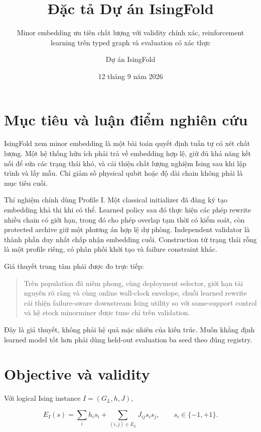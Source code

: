 \documentclass[
  vietnamese,
  10pt,
  a4paper,
]{article}
\title{Đặc tả Dự án IsingFold}
\subtitle{Minor embedding ưu tiên chất lượng với validity chính xác,
reinforcement learning trên typed graph và evaluation có xác thực}
\author{Dự án IsingFold}
\date{12 tháng 9 năm 2026}
\begin{document}
\maketitle

{
\setcounter{tocdepth}{3}
\tableofcontents
}
\section{Mục tiêu và luận điểm nghiên
cứu}\label{mux1ee5c-tiuxeau-vuxe0-luux1eadn-ux111iux1ec3m-nghiuxean-cux1ee9u}

IsingFold xem minor embedding là một bài toán quyết định tuần tự có xét
chất lượng. Một hệ thống hữu ích phải trả về embedding hợp lệ, giữ đủ
khả năng kết nối để sửa các trạng thái khó, và cải thiện chất lượng
nghiệm Ising sau khi lập trình và lấy mẫu. Chỉ giảm số physical qubit
hoặc độ dài chain không phải là mục tiêu cuối.

Thí nghiệm chính dùng Profile I. Một classical initializer đã đăng ký
tạo embedding khả thi khi có thể. Learned policy sau đó thực hiện các
phép rewrite nhiều chain có giới hạn, trong đó cho phép overlap tạm thời
có kiểm soát, còn protected archive giữ một phương án hợp lệ dự phòng.
Independent validator là thành phần duy nhất chấp nhận embedding cuối.
Construction từ trạng thái rỗng là một profile riêng, có phân phối khởi
tạo và failure constraint khác.

Giả thuyết trung tâm phải được đo trực tiếp:

\begin{quote}
Trên population đã niêm phong, cùng deployment selector, giới hạn tài
nguyên rõ ràng và cùng online wall-clock envelope, chuỗi learned rewrite
cải thiện failure-aware downstream Ising utility so với same-support
control và hệ stock minorminer được tune chỉ trên validation.
\end{quote}

Đây là giả thuyết, không phải hệ quả mặc nhiên của kiến trúc. Muốn khẳng
định learned model tốt hơn phải dùng held-out evaluation ba seed theo
đúng registry.

\section{Objective và validity}\label{objective-vuxe0-validity}

Với logical Ising instance \(I=(G_L,h,J)\),

\[
E_I(s)=\sum_i h_i s_i+\sum_{(i,j)\in E_L}J_{ij}s_i s_j,
\qquad s_i\in\{-1,+1\}.
\]
\end{document}
